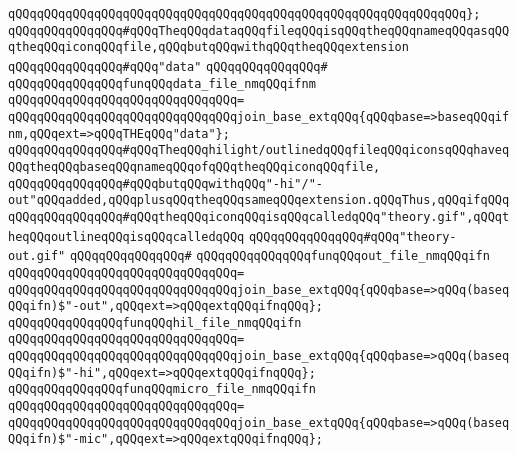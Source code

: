 \verb|qQQqqQQqqQQqqQQqqQQqqQQqqQQqqQQqqQQqqQQqqQQqqQQqqQQqqQQqqQQqqQQq};|\newline
\newline
\verb|qQQqqQQqqQQqqQQq#qQQqTheqQQqdataqQQqfileqQQqisqQQqtheqQQqnameqQQqasqQQqtheqQQqiconqQQqfile,qQQqbutqQQqwithqQQqtheqQQqextension|\newline
\verb|qQQqqQQqqQQqqQQq#qQQq"data"|\newline
\verb|qQQqqQQqqQQqqQQq#|\newline
\verb|qQQqqQQqqQQqqQQqfunqQQqdata_file_nmqQQqifnm|\newline
\verb|qQQqqQQqqQQqqQQqqQQqqQQqqQQqqQQq=|\newline
\verb|qQQqqQQqqQQqqQQqqQQqqQQqqQQqqQQqjoin_base_extqQQq{qQQqbase=>baseqQQqifnm,qQQqext=>qQQqTHEqQQq"data"};|\newline
\newline
\verb|qQQqqQQqqQQqqQQq#qQQqTheqQQqhilight/outlinedqQQqfileqQQqiconsqQQqhaveqQQqtheqQQqbaseqQQqnameqQQqofqQQqtheqQQqiconqQQqfile,|\newline
\verb|qQQqqQQqqQQqqQQq#qQQqbutqQQqwithqQQq"-hi"/"-out"qQQqadded,qQQqplusqQQqtheqQQqsameqQQqextension.qQQqThus,qQQqifqQQq|\newline
\verb|qQQqqQQqqQQqqQQq#qQQqtheqQQqiconqQQqisqQQqcalledqQQq"theory.gif",qQQqtheqQQqoutlineqQQqisqQQqcalledqQQq|\newline
\verb|qQQqqQQqqQQqqQQq#qQQq"theory-out.gif"|\newline
\verb|qQQqqQQqqQQqqQQq#|\newline
\verb|qQQqqQQqqQQqqQQqfunqQQqout_file_nmqQQqifn|\newline
\verb|qQQqqQQqqQQqqQQqqQQqqQQqqQQqqQQq=|\newline
\verb|qQQqqQQqqQQqqQQqqQQqqQQqqQQqqQQqjoin_base_extqQQq{qQQqbase=>qQQq(baseqQQqifn)$"-out",qQQqext=>qQQqextqQQqifnqQQq};|\newline
\newline
\verb|qQQqqQQqqQQqqQQqfunqQQqhil_file_nmqQQqifn|\newline
\verb|qQQqqQQqqQQqqQQqqQQqqQQqqQQqqQQq=|\newline
\verb|qQQqqQQqqQQqqQQqqQQqqQQqqQQqqQQqjoin_base_extqQQq{qQQqbase=>qQQq(baseqQQqifn)$"-hi",qQQqext=>qQQqextqQQqifnqQQq};|\newline
\newline
\verb|qQQqqQQqqQQqqQQqfunqQQqmicro_file_nmqQQqifn|\newline
\verb|qQQqqQQqqQQqqQQqqQQqqQQqqQQqqQQq=|\newline
\verb|qQQqqQQqqQQqqQQqqQQqqQQqqQQqqQQqjoin_base_extqQQq{qQQqbase=>qQQq(baseqQQqifn)$"-mic",qQQqext=>qQQqextqQQqifnqQQq};|\newline
